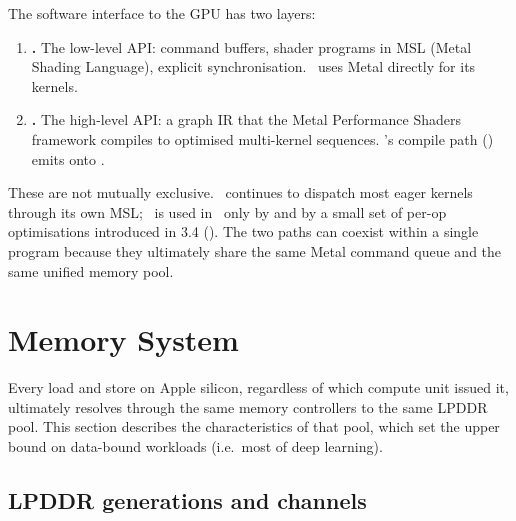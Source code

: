 The software interface to the GPU has two layers:
\begin{enumerate}
  \item \textbf{\Metal.} The low-level API: command buffers, shader
    programs in MSL (Metal Shading Language), explicit synchronisation.
    \MLX\ uses Metal directly for its kernels.
  \item \textbf{\MPSGraph.} The high-level API: a graph IR that the
    Metal Performance Shaders framework compiles to optimised
    multi-kernel sequences. \Lucid's compile path
    () emits onto \MPSGraph.
\end{enumerate}

These are not mutually exclusive. \MLX\ continues to dispatch most
eager kernels through its own MSL; \MPSGraph\ is used in \Lucid\
only by  and by a small set of per-op
optimisations introduced in 3.4 (). The
two paths can coexist within a single program because they ultimately
share the same Metal command queue and the same unified memory pool.

\section{Memory System}
\label{sec:apple_silicon:memory}

Every load and store on Apple silicon, regardless of which compute
unit issued it, ultimately resolves through the same memory
controllers to the same LPDDR pool. This section describes the
characteristics of that pool, which set the upper bound on data-bound
workloads (i.e.\ most of deep learning).

\subsection{LPDDR generations and channels}
\label{ssec:apple_silicon:memory_lpddr}

